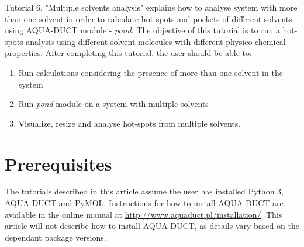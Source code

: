 \documentclass[9pt,tutorial]{livecoms}
\begin{document}
Tutorial 6, "Multiple solvents analysis" explains how to analyse system with more than one solvent in order to calculate hot-spots and pockets of different solvents using AQUA-DUCT module - \textit{pond}. The objective of this tutorial is to run a hot-spots analysis using different solvent molecules with different physico-chemical properties. After completing this tutorial, the user should be able to:
\begin{enumerate}
  \item Run calculations considering the presence of more than one solvent in the system
  \item Run \textit{pond} module on a system with multiple solvents
  \item Visualize, resize and analyse hot-spots from multiple solvents.
\end{enumerate}

\section{Prerequisites}

The tutorials described in this article assume the user has installed Python 3, AQUA-DUCT and PyMOL. Instructions for how to install AQUA-DUCT are available in the online manual at \url{http://www.aquaduct.pl/installation/}. This article will not describe how to install AQUA-DUCT, as details vary based on the dependant package versions.
\end{document}
